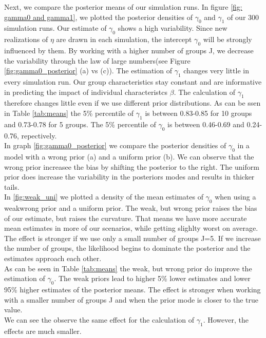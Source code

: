Next, we compare the posterior means of our simulation runs. In figure \ref{fig: gamma0 and gamma1}, we plotted the posterior densities of $\gamma_0$ and $\gamma_1$ of our 300 simulation runs. Our estimate of $\gamma_0$ shows a high variability. Since new realizations of $\eta$ are drawn in each simulation, the intercept $\gamma_0$ will be strongly influenced by them. By working with a higher number of groups J, we decrease the variability through the law of large numbers(see Figure \ref{fig:gamma0_posterior} (a) vs (c)).
The estimation of $\gamma_1$  changes very little in every simulation run. Our group characteristics stay constant and are informative in predicting the impact of individual characteristcs $\beta$. 
The calculation of $\gamma_1$ therefore changes little even if we use different prior distributions. As can be ssen in Table \ref{tab:means} the 5\% percentile of $\gamma_1$ is between 0.83-0.85 for 10 groups and 0.73-0.78 for 5 groups.
The 5\% percentile of $\gamma_0$ is between 0.46-0.69 and 0.24-0.76, repectively.\\
In graph \ref{fig:gamma0_posterior} we compare the posterior densities of $\gamma_0$ in a model with a wrong prior (a) and a uniform prior (b). We can observe that the wrong prior increasee the bias by shifting the posterior to the right. The uniform prior does increase the variability in the posteriors modes and results in thicker tails.\\
In \ref{fig:weak_uni} we plotted a density of the mean estimates of $\gamma_0$ when using a weakwrong prior and a uniform prior. The weak, but wrong prior raises the bias of our estimate, but raises the curvature. That means we have more accurate mean estimates in more of our scenarios, while getting slighlty worst on average. The effect is stronger if we use only a small number of groups J=5. If we increase the number of groups, the likelihood begins to dominate the posterior and the estimates approach each other. \\
As can be seen in Table \ref{tab:means} the weak, but wrong prior do improve the estimation of $\gamma_0$. The weak priors lead to higher 5\% lower estimates and lower 95\% higher estimates of the posterior means. The effect is stronger when working with a smaller number of groups J and when the prior mode is closer to the true value.\\
We can see the observe the same effect for the calculation of $\gamma_1$. However, the effects are much smaller.\\

